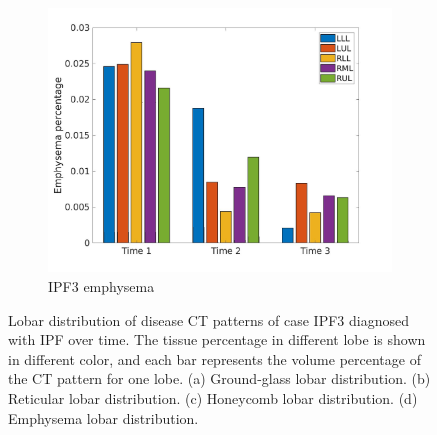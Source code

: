 \begin{figure}[H]
\begin{subfigure}{.46\linewidth}
  \includegraphics[width=\linewidth,trim={{.0\wd0} {.0\wd0} {.0\wd0} {.0\wd0}},clip]{Appendix/Image_AppexA/LobarDistribution/IPF3EmphysemaLobarRegionDiseaseDistributionOverTime.jpg}
  \caption{IPF3 emphysema}
  \label{fig:IPF3LobarRegionDiseaseDistributionOverTime-d}
\end{subfigure}
\caption{Lobar distribution of disease CT patterns of case IPF3 diagnosed with IPF over time. The tissue percentage in different lobe is shown in different color, and each bar represents the volume percentage of the CT pattern for one lobe. (a) Ground-glass lobar distribution. (b) Reticular lobar distribution. (c) Honeycomb lobar distribution. (d) Emphysema lobar distribution.}
\label{fig:IPF3LobarRegionDiseaseDistributionOverTime}
\end{figure}


